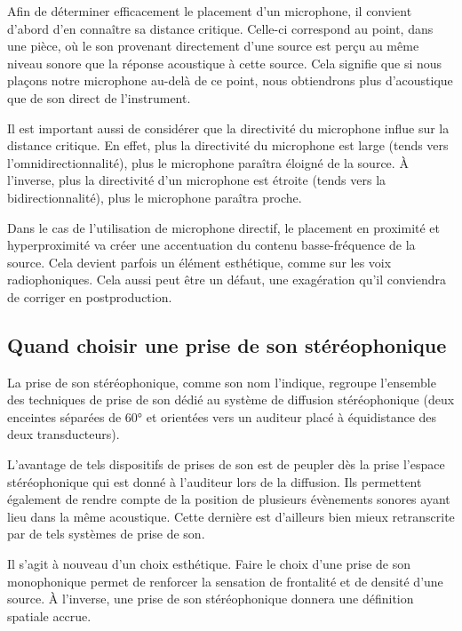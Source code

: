 \documentclass[
]{book}
\begin{document}
Afin de déterminer efficacement le placement d'un microphone, il convient d'abord d'en connaître sa distance critique. Celle-ci correspond au point, dans une pièce, où le son provenant directement d'une source est perçu au même niveau sonore que la réponse acoustique à cette source. Cela signifie que si nous plaçons notre microphone au-delà de ce point, nous obtiendrons plus d'acoustique que de son direct de l'instrument.

Il est important aussi de considérer que la directivité du microphone influe sur la distance critique. En effet, plus la directivité du microphone est large (tends vers l'omnidirectionnalité), plus le microphone paraîtra éloigné de la source. À l'inverse, plus la directivité d'un microphone est étroite (tends vers la bidirectionnalité), plus le microphone paraîtra proche.

Dans le cas de l'utilisation de microphone directif, le placement en proximité et hyperproximité va créer une accentuation du contenu basse-fréquence de la source. Cela devient parfois un élément esthétique, comme sur les voix radiophoniques. Cela aussi peut être un défaut, une exagération qu'il conviendra de corriger en postproduction.

\hypertarget{quand-choisir-une-prise-de-son-stuxe9ruxe9ophonique}{%
\subsection{Quand choisir une prise de son stéréophonique}\label{quand-choisir-une-prise-de-son-stuxe9ruxe9ophonique}}

La prise de son stéréophonique, comme son nom l'indique, regroupe l'ensemble des techniques de prise de son dédié au système de diffusion stéréophonique (deux enceintes séparées de 60° et orientées vers un auditeur placé à équidistance des deux transducteurs).

L'avantage de tels dispositifs de prises de son est de peupler dès la prise l'espace stéréophonique qui est donné à l'auditeur lors de la diffusion. Ils permettent également de rendre compte de la position de plusieurs évènements sonores ayant lieu dans la même acoustique. Cette dernière est d'ailleurs bien mieux retranscrite par de tels systèmes de prise de son.

Il s'agit à nouveau d'un choix esthétique. Faire le choix d'une prise de son monophonique permet de renforcer la sensation de frontalité et de densité d'une source. À l'inverse, une prise de son stéréophonique donnera une définition spatiale accrue.
\end{document}

